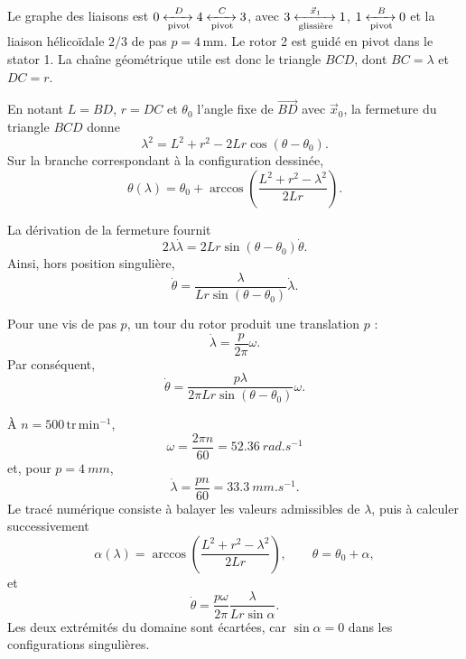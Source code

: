 \begin{corrigebox}

Le graphe des liaisons est
$0\xleftrightarrow[\text{pivot}]{D}4\xleftrightarrow[\text{pivot}]{C}3$,
avec $3\xleftrightarrow[\text{glissière}]{\vec x_1}1$,
$1\xleftrightarrow[\text{pivot}]{B}0$ et la liaison hélicoïdale
$2/3$ de pas $p=4\,\mathrm{mm}$. Le rotor 2 est guidé en pivot dans le
stator 1. La chaîne géométrique utile est donc le triangle $BCD$, dont
$BC=\lambda$ et $DC=r$.

En notant $L=BD$, $r=DC$ et $\theta_0$ l'angle fixe de
$\overrightarrow{BD}$ avec $\vec x_0$, la fermeture du triangle $BCD$
donne
\[
\lambda^2=L^2+r^2-2Lr\cos(\theta-\theta_0).
\]
Sur la branche correspondant à la configuration dessinée,
\[
\boxed{
\theta(\lambda)=\theta_0+
\arccos\!\left(\frac{L^2+r^2-\lambda^2}{2Lr}\right)
}.
\]

La dérivation de la fermeture fournit
\[
2\lambda\dot\lambda
=2Lr\sin(\theta-\theta_0)\dot\theta.
\]
Ainsi, hors position singulière,
\[
\boxed{
\dot\theta=
\frac{\lambda}{Lr\sin(\theta-\theta_0)}\dot\lambda
}.
\]

Pour une vis de pas $p$, un tour du rotor produit une translation $p$ :
\[
\dot\lambda=\frac{p}{2\pi}\omega.
\]
Par conséquent,
\[
\boxed{
\dot\theta=
\frac{p\lambda}{2\pi Lr\sin(\theta-\theta_0)}\omega
}.
\]

À $n=500\,\mathrm{tr\,min^{-1}}$,
\[
\omega=\frac{2\pi n}{60}=\SI{52.36}{rad.s^{-1}}
\]
et, pour $p=\SI{4}{mm}$,
\[
\dot\lambda=\frac{pn}{60}=\SI{33.3}{mm.s^{-1}}.
\]
Le tracé numérique consiste à balayer les valeurs admissibles de
$\lambda$, puis à calculer successivement
\[
\alpha(\lambda)=
\arccos\!\left(\frac{L^2+r^2-\lambda^2}{2Lr}\right),
\qquad
\theta=\theta_0+\alpha,
\]
et
\[
\dot\theta=
\frac{p\omega}{2\pi}
\frac{\lambda}{Lr\sin\alpha}.
\]
Les deux extrémités du domaine sont écartées, car
$\sin\alpha=0$ dans les configurations singulières.

\end{corrigebox}
